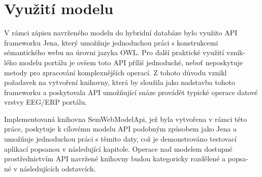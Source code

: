 \documentclass{projekt}
\begin{document}
\section{Využití modelu}
\hspace{0.65cm}V rámci zápisu navrženého modelu do hybridní databáze bylo využito API frameworku Jena, který umožňuje jednoduchou práci s konstrukcemi sémantického webu na úrovni jazyka OWL. Pro další praktické využití vznik-\\lého modelu portálu je ovšem toto API příliš jednoduché, neboť neposkytuje metody pro zpracování komplexnějších operací. Z tohoto důvodu vznikl požadavek na vytvoření knihovny, která by sloužila jako nadstavba tohoto frameworku a poskytovala API umožňující snáze provádět typické operace datové vrstvy EEG/ERP portálu. 

Implementovaná knihovna SemWebModelApi, jež byla vytvořena v rámci této práce, poskytuje k cílovému modelu API podobným způsobem jako Jena a umožňuje jednoduchou práci s těmito daty, což je demonstrováno testovací aplikací popsanou v následující kapitole. Operace nad modelem dostupné prostřednictvím API navržené knihovny budou kategoricky rozdělené a popsa-\\né v následujících odstavcích.
\end{document}

